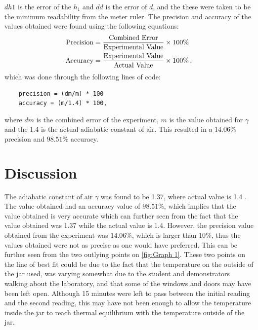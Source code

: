 \documentclass[12pt, a4paper]{article}
\begin{document}
$dh1$ is the error of the $h_1$ and $dd$ is the error of $d$, and the these were taken to be the minimum readability from the meter ruler. The precision and accuracy of the values obtained were found using the following equations:
\begin{align*}
    \text{Precision}&=\frac{\text{Combined Error}}{\text{Experimental Value}} \times 100\% \\
    \smallskip
    \text{Accuracy} &= \frac{\text{Experimental Value}}{\text{Actual Value}} \times 100\% \,,
\end{align*}
which was done through the following lines of code:
\begin{lstlisting}
    precision = (dm/m) * 100
    accuracy = (m/1.4) * 100,
\end{lstlisting}
where $dm$ is the combined error of the experiment, $m$ is the value obtained for $\gamma$ and the 1.4 is the actual adiabatic constant of air. This resulted in a $14.06\%$ precision and $98.51\%$ accuracy.

\section*{Discussion}
The adiabatic constant of air $\gamma$ was found to be 1.37, where actual value is 1.4 \parencite{muncaster}. The value obtained had an accuracy value of $98.51\%$, which implies that the value obtained is very accurate which can further seen from the fact that the value obtained was 1.37 while the actual value is 1.4. However, the precision value obtained from the experiment was $14.06\%$, which is larger than $10\%$, thus the values obtained were not as precise as one would have preferred. This can be further seen from the two outlying points on \ref{fig:Graph 1}. These two points on the line of best fit could be due to the fact that the temperature on the outside of the jar used, was varying somewhat due to the student and demonstrators walking about the laboratory, and that some of the windows and doors may have been left open. Although 15 minutes were left to pass between the initial reading and the second reading, this may have not been enough to allow the temperature inside the jar to reach thermal equilibrium with the temperature outside of the jar.
\end{document}
